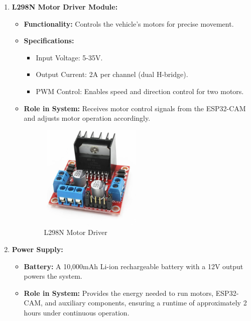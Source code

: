\documentclass[12pt,a4paper]{report}
\begin{document}
\begin{enumerate}
\begin{itemize}
 
    \end{itemize}



    \item \textbf{L298N Motor Driver Module:}

    \begin{itemize}
        \item \textbf{Functionality:} Controls the vehicle's motors for precise movement.
        \item \textbf{Specifications:}
        \begin{itemize}
            \item Input Voltage: 5-35V.
            \item Output Current: 2A per channel (dual H-bridge).
            \item PWM Control: Enables speed and direction control for two motors.
        \end{itemize}
        \item \textbf{Role in System:} Receives motor control signals from the ESP32-CAM and adjusts motor operation accordingly.\\


\begin{figure}[H]
    \centering
    \begin{minipage}{0.45\textwidth}
        \centering
        \includegraphics[width=5cm, height=5cm]{l298n}
        \caption{L298N Motor Driver}
        \label{fig:l298n}
    \end{minipage}
\end{figure}


    
    \end{itemize}
    
    
    \item \textbf{Power Supply:}
    \begin{itemize}
        \item \textbf{Battery:} A 10,000mAh Li-ion rechargeable battery with a 12V output powers the system.
        \item \textbf{Role in System:} Provides the energy needed to run motors, ESP32-CAM, and auxiliary components, ensuring a runtime of approximately 2 hours under continuous operation.
        

\end{itemize}
\end{enumerate}
\end{document}
